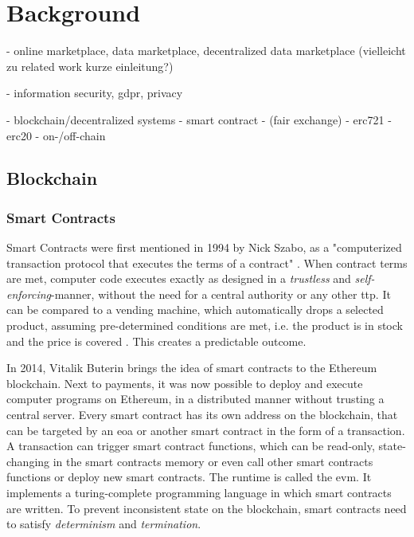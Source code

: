 \chapter{Background}
\label{cha:background}

- online marketplace, data marketplace, decentralized data marketplace (vielleicht zu related work kurze einleitung?)

- information security, gdpr, privacy

- blockchain/decentralized systems
- smart contract
- (fair exchange)
- erc721
- erc20
- on-/off-chain

\section{Blockchain}
\label{sec:blockchain}

\subsection{Smart Contracts}
\label{subsec:sc}

Smart Contracts were first mentioned in 1994 by Nick Szabo, as a "computerized transaction protocol that executes the terms of a contract" \cite{Szabo_1997}. When contract terms are met, computer code executes exactly as designed in a \emph{trustless} and \emph{self-enforcing}-manner, without the need for a central authority or any other \acrshort{ttp}. It can be compared to a vending machine, which automatically drops a selected product, assuming pre-determined conditions are met, i.e. the product is in stock and the price is covered \cite{Szabo_1997}. This creates a predictable outcome.

In 2014, Vitalik Buterin \cite{buterinNEXTGENERATIONSMART} brings the idea of smart contracts to the Ethereum blockchain. Next to payments, it was now possible to deploy and execute computer programs on Ethereum, in a distributed manner without trusting a central server. Every smart contract has its own address on the blockchain, that can be targeted by an \acrfull{eoa} or another smart contract in the form of a transaction. A transaction can trigger smart contract functions, which can be read-only, state-changing in the smart contracts memory or even call other smart contracts functions or deploy new smart contracts. The runtime is called the \acrfull{evm}. It implements a turing-complete programming language in which smart contracts are written. To prevent inconsistent state on the blockchain, smart contracts need to satisfy \emph{determinism} and \emph{termination}.

